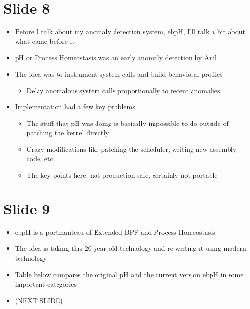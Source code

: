 \documentclass[
  12pt]{findlay}
\providecommand{\tightlist}{\setlength{\itemsep}{0pt}\setlength{\parskip}{0pt}}
\begin{document}
\hypertarget{slide-8}{%
\section{Slide 8}\label{slide-8}}

\begin{itemize}
\tightlist
\item
  Before I talk about my anomaly detection system, ebpH, I'll talk a bit
  about what came before it
\item
  pH or Process Homeostasis was an early anomaly detection by Anil
\item
  The idea was to instrument system calls and build behavioral profiles

  \begin{itemize}
  \tightlist
  \item
    Delay anomalous system calls proportionally to recent anomalies
  \end{itemize}
\item
  Implementation had a few key problems

  \begin{itemize}
  \tightlist
  \item
    The stuff that pH was doing is basically impossible to do outside of
    patching the kernel directly
  \item
    Crazy modifications like patching the scheduler, writing new
    assembly code, etc.
  \item
    The key points here: not production safe, certainly not portable
  \end{itemize}
\end{itemize}

\hypertarget{slide-9}{%
\section{Slide 9}\label{slide-9}}

\begin{itemize}
\tightlist
\item
  ebpH is a portmanteau of Extended BPF and Process Homeostasis
\item
  The idea is taking this 20 year old technology and re-writing it using
  modern technology
\item
  Table below compares the original pH and the current version ebpH in
  some important categories
\item
  (NEXT SLIDE)
\end{itemize}
\end{document}
